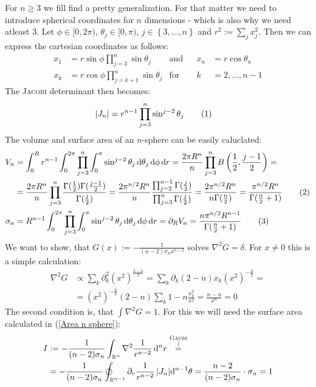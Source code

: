 \documentclass[a4paper,12pt]{article}
\newcommand\numberthis{\addtocounter{equation}{1}\tag{\theequation}}
\newcommand{\kom}{}
\newcommand{\intx}{}
\newcommand{\intr}{}
\newcommand{\kla}{}
\newcommand{\klammer}{}
\newcommand{\tecxt}{}
\begin{document}
For $n\ge 3$ we fill find a pretty generalization. For that matter we need to introduce spherical coordinates for $n$ dimensions - which is also why we need atleast 3. Let $\phi\in[0,2\pi)$, $\theta_j\in[0,\pi)$, $j\in\klammer\left\{{3, \dots, n} \right\}$ and $r^2:=\sum_jx_j^2$. Then we can express the cartesian coordinates as follows:
\begin{align*}
x_1&=r\sin\phi\prod_{j=3}^n\sin\theta_j&\tecxt\text{and}&&x_n&=r\cos\theta_n\\
x_k&=r\cos\phi\prod_{j=k+1}^n\sin\theta_j&\tecxt\text{for}&&k&=2,\dots,n-1
\end{align*}
The \textsc{Jacobi} determinant then becomes:
\begin{align*}
|J_n|&=r^{n-1}\prod_{j=3}^n\sin^{j-2}\theta_j\numberthis\label{Jacobi determinant for n spherical dimensions}
\end{align*}
The volume and surface area of an $n$-sphere can be easily caluclated:
\begin{align*}
V_n&=\intx\int_{0}^{R}r^{n-1}\intx\int_{0}^{2\pi}\prod_{j=3}^n\intx\int_{0}^{\pi}\sin^{j-2}\theta_j\,\mathrm{d}\theta_j\,\mathrm{d}\phi\,\mathrm{d}r=\frac{2\pi R^n}{n}\prod_{j=3}^nB\kla\left( {\frac{1}{2},\frac{j-1}{2}} \right)=\\
&=\frac{2\pi R^n}{n}\prod_{j=3}^n\frac{\Gamma(\frac{1}{2})\Gamma(\frac{j-1}{2})}{\Gamma(\frac{j}{2})}=\frac{2\pi^{n/2}R^n}{n}\frac{\prod_{j=2}^{n-1}\Gamma(\frac{j}{2})}{\prod_{j=3}^n\Gamma(\frac{j}{2})}=\frac{2\pi^{n/2}R^n}{n\Gamma(\frac{n}{2})}=\frac{\pi^{n/2}R^n}{\Gamma(\frac{n}{2}+1)}\numberthis\label{Volume n sphere}\\
\sigma_n&=R^{n-1}\intx\int_{0}^{2\pi}\prod_{j=3}^n\intx\int_{0}^{\pi}\sin^{j-2}\theta_j\,\mathrm{d}\theta_j\,\mathrm{d}\phi\,\mathrm{d}r=\partial_RV_n=\frac{n\pi^{n/2}R^{n-1}}{\Gamma(\frac{n}{2}+1)}\numberthis\label{Area n sphere}
\end{align*}
We want to show, that $G(x):=-\frac{1}{(n-2)\sigma_n x^{n-2}}$ solves $\nabla^2G=\delta$. For $x\neq 0$ this is a simple calculation:
\begin{align*}
\nabla^2G&\propto\sum_k\partial_k^2\kla\left( {x^2} \right)^{\frac{2-n}{2}}=\sum_k\partial_k(2-n)x_k\kla\left( {x^2} \right)^{-\frac{n}{2}}=\\
&=\kla\left( {x^2} \right)^{-\frac{n}{2}}(2-n)\sum_k1-n\frac{x_k^2}{x^2}=\frac{n-n}{x^n}=0
\end{align*}
The second condition is, that $\int\nabla^2G=1$. For this we will need the surface area calculated in (\ref{Area n sphere}):
\begin{align*}
I&:=-\frac{1}{(n-2)\sigma_n}\intr\int_{\mathbb{R}^{n}}\nabla^2{\frac{1}{r^{n-2}}}\,\mathrm{d}^{n}r\kom\overset{\substack{{\tecxt\textsc{Gauss}} \\ |}}{=}\\
&=-\frac{1}{(n-2)\sigma_n}\intr\oint_{\mathbb{R}^{n-1}}{\partial_r\frac{1}{r^{n-2}}}\,|J_n|\mathrm{d}^{n-1}\theta=\frac{n-2}{(n-2)\sigma_n}\cdot\sigma_n=1
\end{align*}
\end{document}
